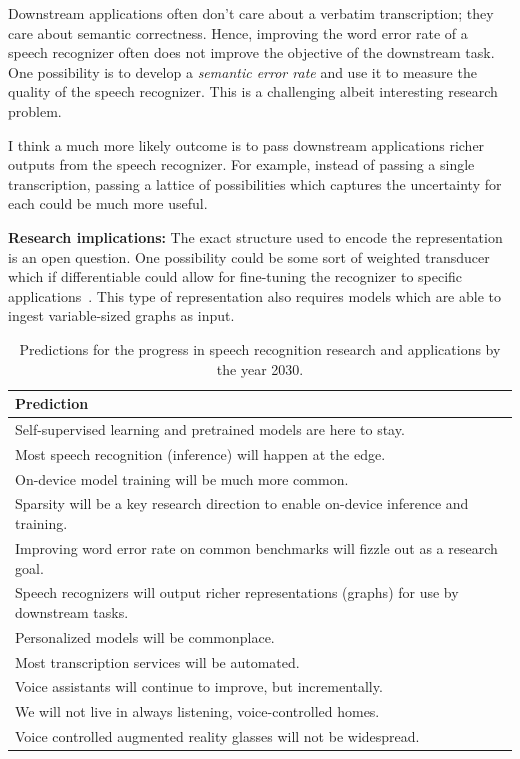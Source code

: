 Downstream applications often don't care about a verbatim transcription; they
care about semantic correctness. Hence, improving the word error rate of a
speech recognizer often does not improve the objective of the downstream task.
One possibility is to develop a \emph{semantic error rate} and use
it to measure the quality of the speech recognizer. This is a challenging
albeit interesting research problem.

I think a much more likely outcome is to pass downstream applications richer
outputs from the speech recognizer. For example, instead of passing a single
transcription, passing a lattice of possibilities which captures the
uncertainty for each could be much more useful.

{\bf Research implications:} The exact structure used to encode the
representation is an open question. One possibility could be some sort of
weighted transducer which if differentiable could allow for fine-tuning the
recognizer to specific applications~\cite{k2, hannun2020differentiable}. This
type of representation also requires models which are able to ingest
variable-sized graphs as input.

\begin{table}[ht!]
    \caption{Predictions for the progress in speech recognition research and applications
    by the year 2030.}
    \centering
    \begin{tabular}{l}
    \toprule
    Prediction \\
    \midrule
    Self-supervised learning and pretrained models are here to stay. \\
    \rowcolor{Gray} Most speech recognition (inference) will happen at the edge. \\
    On-device model training will be much more common. \\
    \rowcolor{Gray} Sparsity will be a key research direction to enable on-device inference and training. \\
    Improving word error rate on common benchmarks will fizzle out as a research goal. \\
    \rowcolor{Gray} Speech recognizers will output richer representations (graphs) for use by downstream tasks. \\
    Personalized models will be commonplace. \\
    \rowcolor{Gray} Most transcription services will be automated. \\
    Voice assistants will continue to improve, but incrementally. \\
    \rowcolor{Gray} We will not live in always listening, voice-controlled homes. \\
    Voice controlled augmented reality glasses will not be widespread. \\
    \bottomrule
    \end{tabular}
    \label{tab:predictions}
\end{table}


